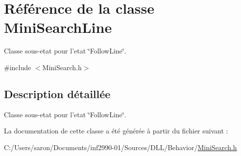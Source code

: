 \hypertarget{class_mini_search_line}{\section{Référence de la classe Mini\-Search\-Line}
\label{class_mini_search_line}
}


Classe sous-\/etat pour l'etat \char`\"{}\-Follow\-Line\char`\"{}.  




{\ttfamily \#include $<$Mini\-Search.\-h$>$}



\subsection{Description détaillée}
Classe sous-\/etat pour l'etat \char`\"{}\-Follow\-Line\char`\"{}. 

La documentation de cette classe a été générée à partir du fichier suivant \-:\begin{DoxyCompactItemize}
\item 
C\-:/\-Users/saron/\-Documents/inf2990-\/01/\-Sources/\-D\-L\-L/\-Behavior/\hyperlink{_mini_search_8h}{Mini\-Search.\-h}\end{DoxyCompactItemize}
